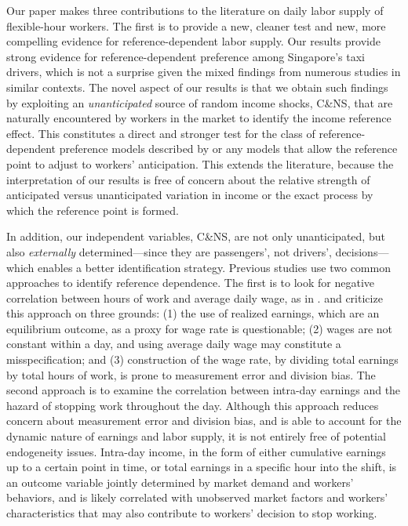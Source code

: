\documentclass[reviewmode]{restat}
\begin{document}
Our paper makes three contributions to the literature on daily labor supply 
of flexible-hour workers. The first is to provide a new, cleaner test %
and new, more compelling evidence for reference-dependent labor supply. Our results provide strong evidence for reference-dependent 
preference among Singapore's taxi drivers, which is not a surprise given the mixed findings from numerous 
studies in similar contexts. The novel aspect of our results is that we obtain such findings by exploiting
an \textit{unanticipated} source of random income shocks, C\&NS, that are naturally encountered by workers
in the market to identify the income reference effect. This constitutes a direct and stronger test for the
class of reference-dependent preference models described by \citet{kHoszegi2006model} or any models that 
allow the reference point to adjust to workers' anticipation. This extends the literature, because the
interpretation of our results is free of concern about the relative strength of anticipated versus 
unanticipated variation in income or the exact process by which the reference point is formed.

In addition, our independent variables, C\&NS, are not only unanticipated, but also \textit{externally} 
determined---since they are passengers', not drivers', decisions---which enables a better identification
strategy. Previous studies use two common approaches to identify reference dependence. The first is to
look for negative correlation between hours of work and average daily wage, as in \citet{camerer1997labor}. \citet{oettinger1999empirical} and \citet{farber2005tomorrow}  criticize this approach on three grounds:
(1) the use of realized earnings, which are an equilibrium outcome, as a proxy for wage rate is questionable; 
(2) wages are not constant within a day, and using average daily wage may constitute a misspecification; and
(3) construction of the wage rate, by dividing total earnings by total hours of work, is prone to measurement
error and division bias. The second approach is to examine the correlation between intra-day earnings and
the hazard of stopping work throughout the day. Although this approach reduces concern about measurement 
error and division bias, and is able to account for the dynamic nature of earnings and labor supply, it is
not entirely free of potential endogeneity issues. Intra-day income, in the form of either cumulative earnings 
up to a certain point in time, or total earnings in a specific hour into the shift, is an outcome variable 
jointly determined by market demand and workers' behaviors, and is likely correlated with unobserved market 
factors and workers' characteristics that may also contribute to workers' decision to stop working. 
\end{document}
